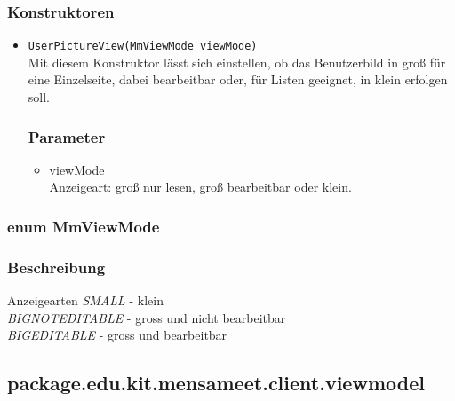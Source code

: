 \documentclass[a4paper]{scrreprt}
\begin{document}
\subsubsection*{Konstruktoren}
\begin{addmargin}[25pt]{0pt}
\begin{itemize}

\item \texttt{UserPictureView(MmViewMode viewMode)}\\
	Mit diesem Konstruktor lässt sich einstellen, ob das Benutzerbild in groß für eine Einzelseite, dabei bearbeitbar oder, für Listen geeignet, in klein erfolgen soll.

	\subsubsection*{Parameter}
	\begin{itemize}
	\item viewMode \\
		Anzeigeart: groß nur lesen, groß bearbeitbar oder klein.
	\end{itemize}

\end{itemize}
\end{addmargin}


\subsubsection{enum MmViewMode}
\subsubsection*{Beschreibung}
Anzeigearten
\textit{SMALL} - klein \\
\textit{BIGNOTEDITABLE} - gross und nicht bearbeitbar \\
\textit{BIGEDITABLE} - gross und bearbeitbar \\


\newpage
\subsection{package.edu.kit.mensameet.client.viewmodel}

\end{document}
